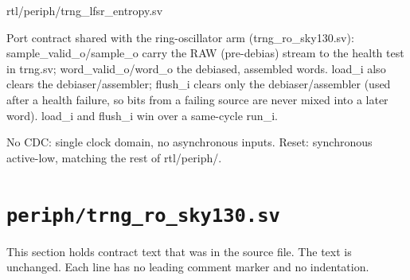 \begin{relocated}{rtl/periph/trng_lfsr_entropy.sv}
\begin{textblock}
Port contract shared with the ring-oscillator arm (trng_ro_sky130.sv): sample_valid_o/sample_o
carry the RAW (pre-debias) stream to the health test in trng.sv; word_valid_o/word_o the
debiased, assembled words. load_i also clears the debiaser/assembler; flush_i clears only the
debiaser/assembler (used after a health failure, so bits from a failing source are never
mixed into a later word). load_i and flush_i win over a same-cycle run_i.

No CDC: single clock domain, no asynchronous inputs. Reset: synchronous active-low, matching
the rest of rtl/periph/.
\end{textblock}

\end{relocated}

\section{\texttt{periph/trng\_ro\_sky130.sv}}\label{ds:mod:trng-ro-sky130}

This section holds contract text that was in the source file. The text is unchanged. Each line has no leading comment marker and no indentation.

